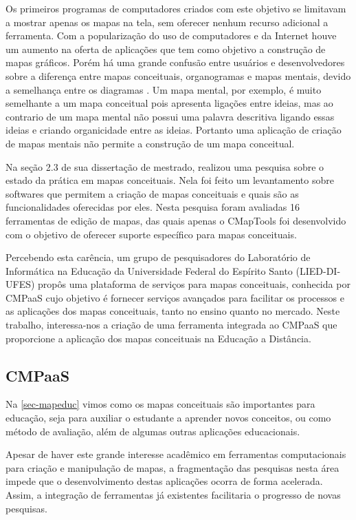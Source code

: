 \documentclass[
	12pt,				%
	openright,			%
	oneside,			%
	a4paper,			%
	english,			%
	french,				%
	spanish,			%
	brazil				%
	]{abntex2}
\begin{document}
Os primeiros programas de computadores criados com este objetivo se limitavam a mostrar apenas os mapas na tela, sem oferecer nenhum recurso adicional a ferramenta. Com a popularização do uso de computadores e da Internet houve um aumento na oferta de aplicações que tem como objetivo a construção de mapas gráficos. Porém há uma grande confusão entre usuários e desenvolvedores sobre a diferença entre mapas conceituais, organogramas e mapas mentais, devido a semelhança entre os diagramas \cite{Perin2014}. Um mapa mental, por exemplo, é muito semelhante a um mapa conceitual pois apresenta ligações entre ideias, mas ao contrario de um mapa mental não possui uma palavra descritiva ligando essas ideias e criando organicidade entre as ideias. Portanto uma aplicação de criação de mapas mentais não permite a construção de um mapa conceitual. 

Na seção 2.3 de sua dissertação de mestrado,  realizou uma pesquisa sobre o estado da prática em mapas conceituais. Nela foi feito um levantamento sobre softwares que permitem a criação de mapas conceituais e quais são as funcionalidades oferecidas por eles. Nesta pesquisa foram avaliadas 16 ferramentas de edição de mapas, das quais apenas o CMapTools foi desenvolvido com o objetivo de oferecer suporte específico para mapas conceituais.

Percebendo esta carência, um grupo de pesquisadores do Laboratório de Informática na Educação da Universidade Federal do Espírito Santo (LIED-DI-UFES) propôs uma plataforma de serviços para mapas conceituais, conhecida por CMPaaS \cite{Perin2016} cujo objetivo é fornecer serviços avançados para facilitar os processos e as aplicações dos mapas conceituais, tanto no ensino quanto no mercado. Neste trabalho, interessa-nos a criação de uma ferramenta integrada ao CMPaaS que proporcione a aplicação dos mapas conceituais na Educação a Distância. 

\subsection{CMPaaS}

Na \autoref{sec-mapeduc} vimos como os mapas conceituais são importantes para educação, seja para auxiliar o estudante a aprender novos conceitos, ou como método de avaliação, além de algumas outras aplicações educacionais. 

Apesar de haver este grande interesse acadêmico em ferramentas computacionais para criação e manipulação de mapas, a fragmentação das pesquisas nesta área impede que o desenvolvimento destas aplicações ocorra de forma acelerada. Assim, a integração de ferramentas já existentes facilitaria o progresso de novas pesquisas.
\end{document}

